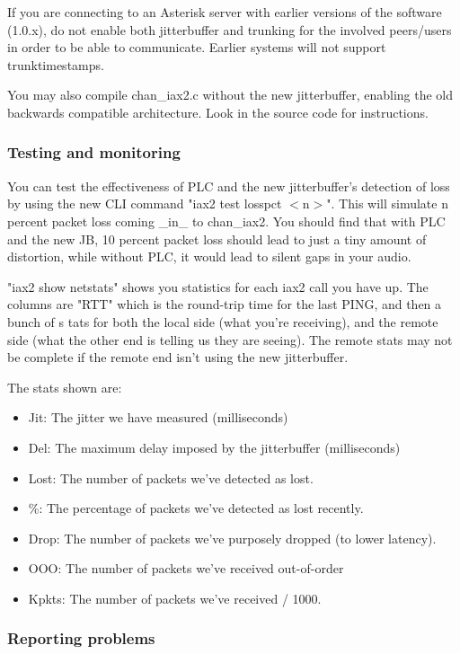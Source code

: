 If you are connecting to an Asterisk server with earlier versions of the software (1.0.x),
do not enable both jitterbuffer and trunking for the involved peers/users 
in order to be able  to communicate. Earlier systems will not support trunktimestamps.

You may also compile chan\_iax2.c without the new jitterbuffer, enabling the old 
backwards compatible architecture. Look in the source code for instructions.


\subsubsection{Testing and monitoring}

You can test the effectiveness of PLC and the new jitterbuffer's detection of loss by using 
the new CLI command "iax2 test losspct $<$n$>$".  This will simulate n percent packet loss 
coming \_in\_ to chan\_iax2. You should find that with PLC and the new JB, 10 percent packet 
loss should lead to just a tiny amount of distortion, while without PLC, it would lead to 
silent gaps in your audio.

"iax2 show netstats" shows you statistics for each iax2 call you have up.  
The columns are "RTT" which is the round-trip time for the last PING, and then a bunch of s
tats for both the local side (what you're receiving), and the remote side (what the other 
end is telling us they are seeing).  The remote stats may not be complete if the remote 
end isn't using the new jitterbuffer.

The stats shown are:
\begin{itemize}
\item Jit: The jitter we have measured (milliseconds)
\item Del: The maximum delay imposed by the jitterbuffer (milliseconds)
\item Lost: The number of packets we've detected as lost.
\item \%: The percentage of packets we've detected as lost recently.
\item Drop: The number of packets we've purposely dropped (to lower latency).
\item OOO: The number of packets we've received out-of-order
\item Kpkts: The number of packets we've received / 1000.
\end{itemize}

\subsubsection{Reporting problems} 

